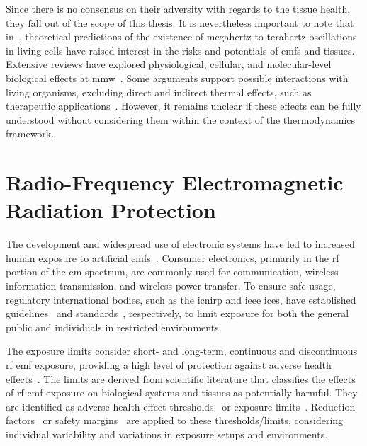 Since there is no consensus on their adversity with regards to the tissue health, they fall out of the scope of this thesis.
It is nevertheless important to note that in~\cite{Fröhlich1968Long}, theoretical predictions of the existence of megahertz to terahertz oscillations in living cells have raised interest in the risks and potentials of \gls{emf}s and tissues.
Extensive reviews have explored physiological, cellular, and molecular-level biological effects at \gls{mmw}~\cite{Pakhomov1998Current,Zhadobov2011Millimeter}.
Some arguments support possible interactions with living organisms, excluding direct and indirect thermal effects, such as therapeutic applications~\cite{Ziskin2006Physiological}.
However, it remains unclear if these effects can be fully understood without considering them within the context of the thermodynamics framework.

\section{Radio-Frequency Electromagnetic Radiation Protection}
The development and widespread use of electronic systems have led to increased human exposure to artificial \gls{emf}s~\cite{Hirata2021Assessment}.
Consumer electronics, primarily in the \gls{rf} portion of the \gls{em} spectrum, are commonly used for communication, wireless information transmission, and wireless power transfer.
To ensure safe usage, regulatory international bodies, such as the \gls{icnirp} and \gls{ieee} \gls{ices}, have established guidelines~\cite{ICNIRP2020Guidelines} and standards~\cite{IEEE2019Standard}, respectively, to limit exposure for both the general public and individuals in restricted environments.

The exposure limits consider short- and long-term, continuous and discontinuous \gls{rf} \gls{emf} exposure, providing a high level of protection against adverse health effects~\cite{ICNIRP2020Guidelines,IEEE2019Standard}.
The limits are derived from scientific literature that classifies the effects of \gls{rf} \gls{emf} exposure on biological systems and tissues as potentially harmful.
They are identified as adverse health effect thresholds~\cite{ICNIRP2020Guidelines} or exposure limits~\cite{IEEE2019Standard}.
Reduction factors~\cite{ICNIRP2020Guidelines} or safety margins~\cite{IEEE2019Standard} are applied to these thresholds/limits, considering individual variability and variations in exposure setups and environments.

